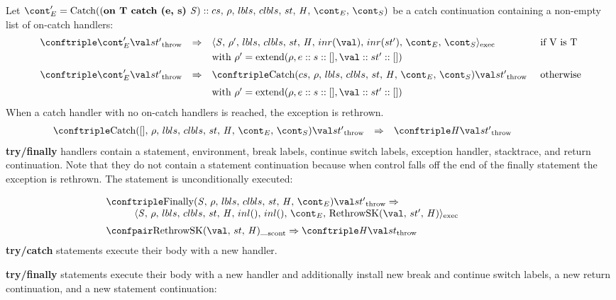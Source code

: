 \documentclass{article}
\DeclareMathOperator{\extend}{extend}
\begin{document}
\noindent
Let $\econt' = \CatchH{(\textbf{on T catch (e, s) }\stmt) :: cs}$ be a catch continuation containing a non-empty list of on-catch handlers:
\[
  \begin{array}{lcll}
	\throwconf{\econt'}{\val}{\strace'}
	& \Rightarrow &
	\execconf{\stmt}{\env'}{\lbls}{\clbls}{\handler}{inr(\val)}{inr(\strace')}{\econt}{\scont}
	&\textrm{ if V is T}\\[1mm]

	&&\textrm{with } \env' = \extend(\env, e :: s :: [], \val :: \strace' :: [])\\[2mm]

	\throwconf{\econt'}{\val}{\strace'}
	& \Rightarrow &
	\throwconf{\CatchH{cs}}{\val}{\strace'}	&\textrm{ otherwise}\\[2mm]
	&&\textrm{with } \env' = \extend(\env, e :: s :: [], \val :: \strace' :: [])
  \end{array}
\]
\noindent
When a catch handler with no on-catch handlers is reached, the exception is rethrown.
\[
  \begin{array}{lcll}
	\throwconf{\CatchH{[]}}{\val}{\strace'}
	& \Rightarrow &
	\throwconf{\handler}{\val}{\strace'}\hspace{20mm}
  \end{array}
\]
\noindent
\textbf{try/finally} handlers contain a statement, environment, break labels, continue switch labels, exception handler, stacktrace, and return continuation.
Note that they do not contain a statement continuation because when control falls off the end of the finally statement the exception is rethrown.
The statement is unconditionally executed:

\[
  \begin{array}{lcl}
	\throwconf{\FinallyK{\stmt}}{\val}{\strace'}
	\Rightarrow \\
	\hspace{10mm}\execconf{\stmt}{\env}{\lbls}{\clbls}{\handler}{inl()}{inl()}{\econt}{\RethrowSK{\val}{\strace'}{\handler}}\hspace{20mm}\\[2mm]

	\scontconf{\RethrowSK{\val}{\strace}{\handler}}{\_}
	\Rightarrow \throwconf{\handler}{\val}{\strace}

  \end{array}
\]
\noindent
\textbf{try/catch} statements execute their body with a new handler.

\noindent
\textbf{try/finally} statements execute their body with a new handler and additionally install new break and continue switch labels, a new return continuation, and a new statement continuation:
\end{document}
